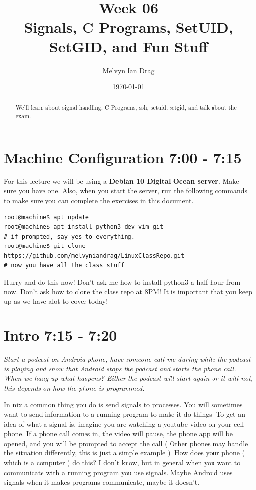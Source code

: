 \documentclass[12pt]{article}
\title{\textbf{Week 06} \\
\Large Signals, C Programs, SetUID, SetGID, and Fun Stuff }
\author{
	Melvyn Ian Drag
}
\date{\today}
\begin{document}
\maketitle

\begin{abstract}
We'll learn about signal handling, C Programs, ssh, setuid, setgid, and talk about the exam.
\end{abstract}

\section{Machine Configuration 7:00 - 7:15}
For this lecture we will be using a \textbf{Debian 10 Digital Ocean server}.
Make sure you have one. Also, when you start the server, run the following
commands to make sure you can complete the exercises in this document.

\begin{lstlisting}[style=term]
root@machine$ apt update
root@machine$ apt install python3-dev vim git
# if prompted, say yes to everything.
root@machine$ git clone https://github.com/melvyniandrag/LinuxClassRepo.git
# now you have all the class stuff
\end{lstlisting}

{\Large Hurry and do this now! Don't ask me how to install python3 a half hour
from now. Don't ask how to clone the class repo at 8PM! It is important that you
keep up as we have alot to cover today!}

\section{Intro 7:15 - 7:20}

\textit{Start a podcast on Android phone, have someone call me during while the
podcast is playing and show that Android stops the podcast and starts the phone
call. When we hang up what happens? Either the podcast will start again or it
will not, this depends on how the phone is programmed.}

In \*nix a common thing you do is send signals to processes. You will sometimes
want to send information to a running program to make it do things. To get an
idea of what a signal is, imagine you are watching a youtube video on your
cell phone. If a phone call comes in, the video will pause, the phone app will
be opened, and you will be prompted to accept the call ( Other phones may
handle the situation differently, this is just a simple example ). How does your
phone ( which is a computer ) do this? I don't know, but in general when you
want to communicate with a running program you use signals. Maybe Android uses
signals when it makes programs communicate, maybe it doesn't.
\end{document}
